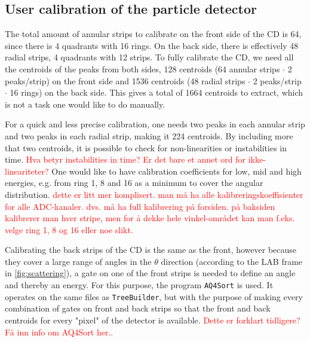 \documentclass[twoside,english]{uiofysmaster/uiofysmaster}
\let\orgautoref\autoref
\renewcommand{\autoref}
        {%
		 \def\sectionautorefname{Section}%
		 \def\subsectionautorefname{Section}%
		 \def\subsubsectionautorefname{Section}%
		 \def\chapterautorefname{Chapter}%
          \orgautoref}
\begin{document}


\subsection{User calibration of the particle detector}\label{ssec:user_cal}
The total amount of annular strips to calibrate on the front side of the CD is 64, since there is 4 quadrants with 16 rings. 
On the back side, there is effectively 48 radial strips, 4 quadrants with 12 strips.
To fully calibrate the CD, we need all the centroids of the peaks from both sides, 128 centroids (64 annular strips $\cdot$ 2 peaks/strip) on the front side and 1536 centroids (48 radial strips $\cdot$ 2 peaks/strip $\cdot$ 16 rings) on the back side. 
This gives a total of 1664 centroids to extract, which is not a task one would like to do manually.

For a quick and less precise calibration, one needs two peaks in each annular strip and two peaks in each radial strip, making it 224 centroids.
By including more that two centroids, it is possible to check for non-linearities or instabilities in time.
\textcolor{red}{Hva betyr instabilities in time? Er det bare et annet ord for ikke-lineariteter?}
One would like to have calibration coefficients for low, mid and high energies, e.g. from ring 1, 8 and 16 as a minimum to cover the angular distribution. \textcolor{red}{dette er litt mer komplisert. man må ha alle kalibreringskoeffisienter for alle ADC-kanaler. dvs. må ha full kalibrering på forsiden. på baksiden kalibrerer man hver stripe, men for å dekke hele vinkel-området kan man f.eks. velge ring 1, 8 og 16 eller noe slikt.}

Calibrating the back strips of the CD is the same as the front, however because they cover a large range of angles in the $\theta$ direction (according to the LAB frame in \autoref{fig:scattering}), a gate on one of the front strips is needed to define an angle and thereby an energy. 
For this purpose, the program \texttt{AQ4Sort} is used. 
It operates on the same files as \texttt{TreeBuilder}, but with the purpose of making every combination of gates on front and back strips so that the front and back centroids for every "pixel" of the detector is available. \textcolor{red}{Dette er forklart tidligere? Få inn info om AQ4Sort her..}
\end{document}

